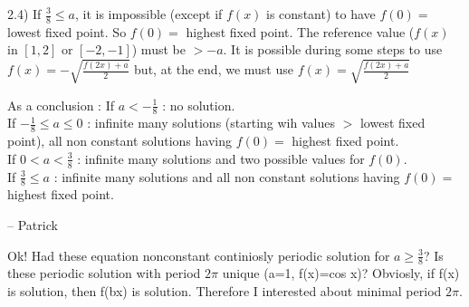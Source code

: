 \begin{mysolution}
2.4) If $\frac{3}{8}\leq a$, it is impossible (except if $f(x)$ is constant) to have $f(0)=$ lowest fixed point. So $f(0)=$ highest fixed point.
The reference value ($f(x)$ in $[1,2]$ or $[-2,-1]$) must be $>-a$.
It is possible during some steps to use $f(x)=-\sqrt{\frac{f(2x)+a}{2}}$ but, at the end, we must use $f(x)=\sqrt{\frac{f(2x)+a}{2}}$

As a conclusion :
If $a<-\frac{1}{8}$ : no solution. \\
If $-\frac{1}{8}\leq a\leq 0$ : infinite many solutions (starting wih values $>$ lowest fixed point), all non constant solutions having $f(0)=$ highest fixed point.\\
If $0<a<\frac{3}{8}$ : infinite many solutions and two possible values for $f(0)$. \\
If $\frac{3}{8}\leq a$ : infinite many solutions and all non constant solutions having $f(0)=$ highest fixed point.

-- 
Patrick
\end{mysolution}



\begin{mysolution}
	Ok!
Had these equation nonconstant continiosly periodic solution for $a\ge \frac{3}{8}$?
Is these periodic solution with period $2\pi$ unique (a=1, f(x)=cos x)?
Obviosly, if f(x) is solution, then f(bx) is solution. Therefore I interested about minimal period $2\pi$.
\end{mysolution}




